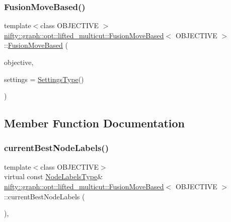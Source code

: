 \subsubsection{\texorpdfstring{Fusion\+Move\+Based()}{FusionMoveBased()}}
{\footnotesize\ttfamily template$<$class O\+B\+J\+E\+C\+T\+I\+VE $>$ \\
\hyperlink{classnifty_1_1graph_1_1opt_1_1lifted__multicut_1_1FusionMoveBased}{nifty\+::graph\+::opt\+::lifted\+\_\+multicut\+::\+Fusion\+Move\+Based}$<$ O\+B\+J\+E\+C\+T\+I\+VE $>$\+::\hyperlink{classnifty_1_1graph_1_1opt_1_1lifted__multicut_1_1FusionMoveBased}{Fusion\+Move\+Based} (\begin{DoxyParamCaption}\item[{const \hyperlink{classnifty_1_1graph_1_1opt_1_1lifted__multicut_1_1FusionMoveBased_a9cb2fb9caff3dac87f0d43cf757e676c}{Objective\+Type} \&}]{objective,  }\item[{const \hyperlink{structnifty_1_1graph_1_1opt_1_1lifted__multicut_1_1FusionMoveBased_1_1SettingsType}{Settings\+Type} \&}]{settings = {\ttfamily \hyperlink{structnifty_1_1graph_1_1opt_1_1lifted__multicut_1_1FusionMoveBased_1_1SettingsType}{Settings\+Type}()} }\end{DoxyParamCaption})}



\subsection{Member Function Documentation}
\mbox{\label{classnifty_1_1graph_1_1opt_1_1lifted__multicut_1_1FusionMoveBased_ad9b947c6c21ec27063ca08f5a5671d90}} 
\subsubsection{\texorpdfstring{current\+Best\+Node\+Labels()}{currentBestNodeLabels()}}
{\footnotesize\ttfamily template$<$class O\+B\+J\+E\+C\+T\+I\+VE$>$ \\
virtual const \hyperlink{classnifty_1_1graph_1_1opt_1_1lifted__multicut_1_1FusionMoveBased_a927c0df1d813436185e85af1714f1fbe}{Node\+Labels\+Type}\& \hyperlink{classnifty_1_1graph_1_1opt_1_1lifted__multicut_1_1FusionMoveBased}{nifty\+::graph\+::opt\+::lifted\+\_\+multicut\+::\+Fusion\+Move\+Based}$<$ O\+B\+J\+E\+C\+T\+I\+VE $>$\+::current\+Best\+Node\+Labels (\begin{DoxyParamCaption}{ }\end{DoxyParamCaption})\hspace{0.3cm}{\ttfamily [inline]}, {\ttfamily [virtual]}}



